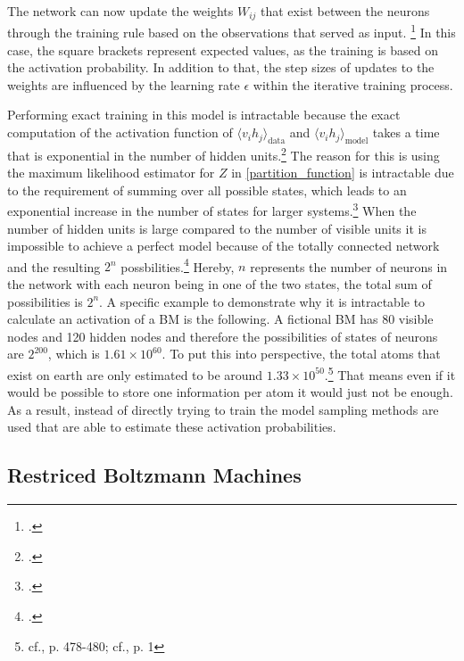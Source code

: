 The network can now update the weights \( W_{ij}\) that exist between the neurons through the training rule based on the observations that served as input. \footcite[cf.][1-2]{barraEquivalenceHopfieldNetworks2012}
In this case, the square brackets represent expected values, as the training is based on the activation probability.
In addition to that, the step sizes of updates to the weights are influenced by the learning rate \(\epsilon\) within the iterative training process.

Performing exact training in this model is intractable because the exact computation of the activation function of \(\langle v_i h_j \rangle_{\text{data}}\) and \(\langle v_i h_j \rangle_{\text{model}}\) takes a time that is exponential in the number of hidden units.\footcite[cf.][449]{salakhutdinovDeepBoltzmannMachines2009}
The reason for this is using the maximum likelihood estimator for \( Z \) in \eqref{partition_function} is intractable due to the requirement of summing over all possible states, which leads to an exponential increase in the number of states for larger systems.\footcite[cf.][2-3]{zhaiDeepStructuredEnergy2016}
When the number of hidden units is large compared to the number of visible units it is impossible to achieve a perfect model because of the totally connected network and the resulting \( 2^n \) possbilities.\footcite[cf.][154]{ackleyLearningAlgorithmBoltzmann1985}
Hereby, \( n\) represents the number of neurons in the network with each neuron being in one of the two states, the total sum of possibilities is \( 2^n \).
A specific example to demonstrate why it is intractable to calculate an activation of a \ac{BM} is the following. A fictional \ac{BM} has 80 visible nodes and 120 hidden nodes and therefore the possibilities of states of neurons are \( 2^{200} \), which is \( 1.61 \times 10^{60}\). 
To put this into perspective, the total atoms that exist on earth are only estimated to be around \( 1.33 \times 10^{50}\).\footnote{cf.\cite{helmenstineHowManyAtoms2022}, p. 478-480; cf.\cite{schlammingerCoolWayMeasure2014}, p. 1}
That means even if it would be possible to store one information per atom it would just not be enough. 
As a result, instead of directly trying to train the model sampling methods are used that are able to estimate these activation probabilities.

\subsection{Restriced Boltzmann Machines}

